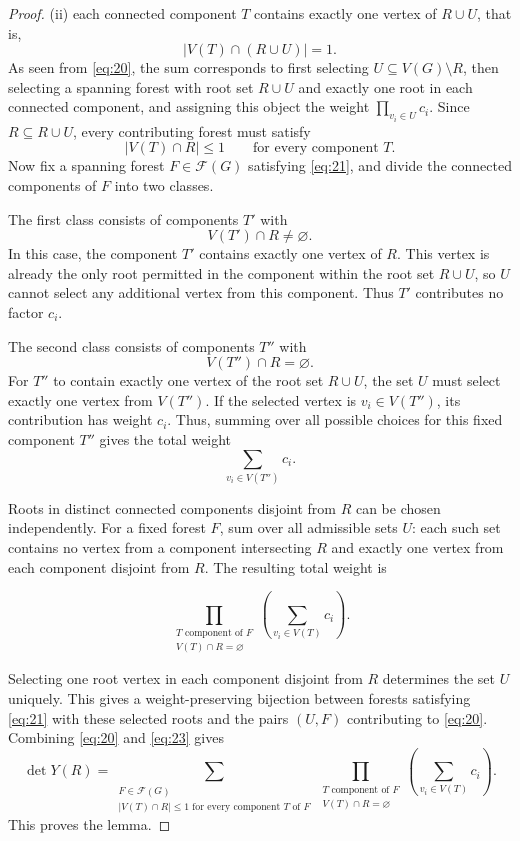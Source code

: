 \documentclass[11pt, a4paper]{article}
\begin{document}
\begin{proof}
(ii) each connected component $T$ contains exactly one vertex of $R\cup U$, that is,
\[
|V(T)\cap(R\cup U)|=1.
\]
As seen from \eqref{eq:20}, the sum corresponds to first selecting $U\subseteq V(G)\setminus R$,
then selecting a spanning forest with root set $R\cup U$ and exactly one root in each connected component,
and assigning this object the weight $\prod_{v_i\in U}c_i$.
Since $R\subseteq R\cup U$, every contributing forest must satisfy
\begin{equation}\label{eq:21}
|V(T)\cap R|\leq 1
\qquad
\text{for every component } T.
\end{equation}
Now fix a spanning forest $F\in \mathcal{F}(G)$ satisfying \eqref{eq:21},
and divide the connected components of $F$ into two classes.

The first class consists of components $T'$ with
\[
V(T')\cap R\neq\varnothing.
\]
In this case, the component $T'$ contains exactly one vertex of $R$.
This vertex is already the only root permitted in the component within the root set $R\cup U$,
so $U$ cannot select any additional vertex from this component. Thus $T'$ contributes no factor $c_i$.

The second class consists of components $T''$ with
\[
V(T'')\cap R=\varnothing.
\]
For $T''$ to contain exactly one vertex of the root set $R\cup U$,
the set $U$ must select exactly one vertex from $V(T'')$. If the selected vertex is
$v_i\in V(T'')$, its contribution has weight $c_i$.
Thus, summing over all possible choices for this fixed component $T''$ gives the total weight
\begin{equation}
\sum_{v_i\in V(T'')}c_i.
\end{equation}





Roots in distinct connected components disjoint from $R$ can be chosen independently.
For a fixed forest $F$, sum over all admissible sets $U$: each such set contains no vertex from a component intersecting $R$ and exactly one vertex from each component disjoint from $R$.
The resulting total weight is

\begin{equation}\label{eq:23}
\prod_{\substack{
T \text{ component of } F\\
V(T)\cap R=\varnothing
}}
\left(
\sum_{v_i\in V(T)}c_i
\right).
\end{equation}

Selecting one root vertex in each component disjoint from $R$ determines the set $U$ uniquely.
This gives a weight-preserving bijection between forests satisfying \eqref{eq:21} with these selected roots and the pairs $(U,F)$ contributing to \eqref{eq:20}.
Combining \eqref{eq:20} and \eqref{eq:23} gives
\[
\det Y(R)
=
\sum_{\substack{F\in\mathcal{F}(G)\\
|V(T)\cap R|\le 1 \text{ for every component } T \text{ of } F}}
\prod_{\substack{T \text{ component of } F\\
V(T)\cap R=\varnothing}}
\left(\sum_{v_i \in V(T)}c_i\right).
\]
This proves the lemma.
\end{proof}
\end{document}
